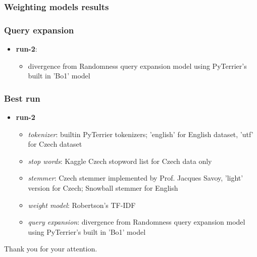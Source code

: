 \documentclass{beamer}
\newcommand{\RunName}[1]{\textbf{#1}}
\let\Oldinput
\renewcommand{}[1]{\resizebox{\textwidth}{!}{\Oldinput{#1}}}
\newcommand{\RunQE}[6]{
    \RunName{#1}

    \begin{itemize}
        \item \emph{tokenizer}: #2
        \item \emph{stop words}: #3
        \item \emph{stemmer}: #4
        \item \emph{weight model}: #5
        \item \emph{query expansion}: #6
    \end{itemize}
}
\newcommand{\RunShort}[2]{
  \RunName{#1}:
  \begin{itemize}
    \item #2
  \end{itemize}
}
\newcommand{\RunResults}[2]{%
\begin{table}[h]
\centering

    \caption{Results of #2.\label{tbl:#1}}
\end{table}
}
\begin{document}
\begin{frame}
  \frametitle{Weighting models results}

\RunResults{wmodels}{\RunName{run-0-tfidf-pivoted},
  \RunName{run-0-tfidf-pivoted-robertson}, \RunName{run-0-bm25},
\RunName{run-0-pl2} and \RunName{run-0-lemur-tfidf}}
\end{frame}

\begin{frame}
  \frametitle{Query expansion}
  \begin{itemize}
    \item \RunShort{run-2}{divergence from Randomness query expansion model
      using PyTerrier's built in 'Bo1' model}
  \end{itemize}

\RunResults{query_expansion}{\RunName{run-2}}
\end{frame}

\begin{frame}
  \frametitle{Best run}
  \begin{itemize}
    \item \RunQE{run-2}{
    builtin PyTerrier tokenizers; 'english' for English dataset, 'utf' for Czech dataset
}{
    Kaggle Czech stopword list for Czech data only
}{
    Czech stemmer implemented by Prof. Jacques Savoy, 'light' version for Czech;
    Snowball stemmer for English
}{Robertson's TF-IDF}{divergence from Randomness query expansion model using PyTerrier's built in 'Bo1' model}
  \end{itemize}
  \RunResults{final}{\RunName{run-0} and \RunName{run-2}}
\end{frame}

\begin{frame}
  \centering
  \Large{Thank you for your attention.}
\end{frame}
\end{document}
